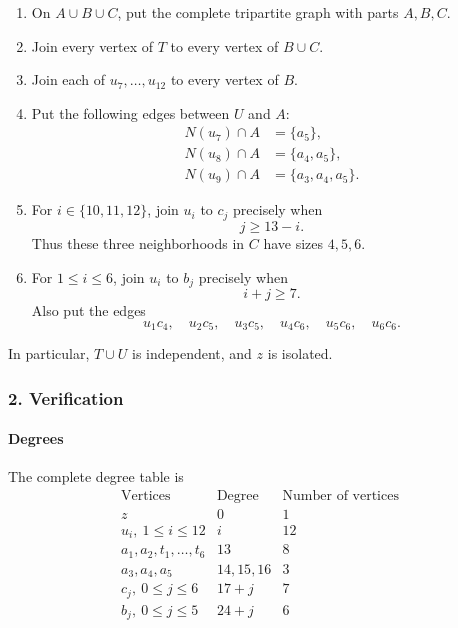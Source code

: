 \documentclass[
  11pt,
  a4paper,
]{article}
\begin{document}
\begin{enumerate}
\def\labelenumi{\arabic{enumi}.}
\item
  On \(A\cup B\cup C\), put the complete tripartite graph with parts
  \(A,B,C\).
\item
  Join every vertex of \(T\) to every vertex of \(B\cup C\).
\item
  Join each of \(u_7,\ldots,u_{12}\) to every vertex of \(B\).
\item
  Put the following edges between \(U\) and \(A\): \begin{equation*}
  \begin{aligned}
  N(u_7)\cap A&=\{a_5\},\\
  N(u_8)\cap A&=\{a_4,a_5\},\\
  N(u_9)\cap A&=\{a_3,a_4,a_5\}.
  \end{aligned}
  \end{equation*}
\item
  For \(i\in\{10,11,12\}\), join \(u_i\) to \(c_j\) precisely when \[
  j\ge 13-i.
  \] Thus these three neighborhoods in \(C\) have sizes \(4,5,6\).
\item
  For \(1\le i\le6\), join \(u_i\) to \(b_j\) precisely when \[
  i+j\ge7.
  \] Also put the edges \[
  u_1c_4,\quad u_2c_5,\quad u_3c_5,\quad
  u_4c_6,\quad u_5c_6,\quad u_6c_6.
  \]
\end{enumerate}

In particular, \(T\cup U\) is independent, and \(z\) is isolated.

\subsubsection{2. Verification}\label{verification}

\paragraph{Degrees}\label{degrees}

The complete degree table is \[
\begin{array}{c|c|c}
\text{Vertices}&\text{Degree}&\text{Number of vertices}\\ \hline
z&0&1\\
u_i,\ 1\le i\le12&i&12\\
a_1,a_2,t_1,\ldots,t_6&13&8\\
a_3,a_4,a_5&14,15,16&3\\
c_j,\ 0\le j\le6&17+j&7\\
b_j,\ 0\le j\le5&24+j&6
\end{array}
\]
\end{document}
